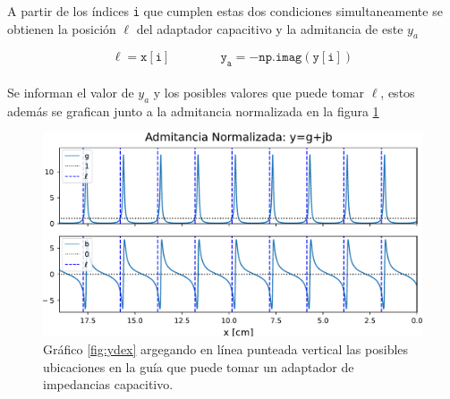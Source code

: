 \documentclass[11pt,a4paper]{article}
\begin{document}
\begin{appendices}
\begin{multicols}{2}
    A partir de los índices \texttt{i} que cumplen estas dos condiciones simultaneamente se obtienen la posición $\ell$ del adaptador capacitivo y la admitancia de este $y_a$ 
    
    \begin{equation*}
        \mathtt{\ell = x[i]\qquad\qquad y_a = - np.imag(y[i])}
    \end{equation*}\\[-1em]

    Se informan el valor de $y_a$ y los posibles valores que puede tomar $\ell$, estos además se grafican junto a la admitancia normalizada en la figura \ref{fig:ydex_l}\\

    \begin{figure}[H]
        \centering
        \includegraphics[width=\linewidth]{Images/ydex_l.pdf}
        \caption{Gráfico \ref{fig:ydex} argegando en línea punteada vertical las posibles ubicaciones en la guía que puede tomar un adaptador de impedancias capacitivo.}
        \label{fig:ydex_l}
    \end{figure}

\end{multicols}
\pagebreak

\end{appendices}


\begin{multicols}{2}

\end{multicols}
\end{document}
